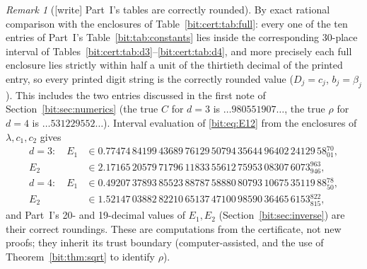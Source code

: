 \documentclass[11pt]{article}
\theoremstyle{definition}\newtheorem{definition}[theorem]{Definition}
\theoremstyle{remark}\newtheorem{remark}[theorem]{Remark}
\begin{document}
\begin{remark}[\textsf{[write]} Part~I's tables are correctly rounded]\label{bit:cert:rem:parti-tables}
By exact rational comparison with the enclosures of
Table~\ref{bit:cert:tab:full}: every one of the ten entries of Part~I's
Table~\ref{bit:tab:constants} lies inside the corresponding 30-place interval
of Tables~\ref{bit:cert:tab:d3}--\ref{bit:cert:tab:d4}, and more precisely each
full enclosure lies strictly within half a unit of the thirtieth decimal of the
printed entry, so every printed digit string is the correctly rounded value
($D_j=c_j$, $b_j=\beta_j$). This includes the two entries discussed in the
first note of Section~\ref{bit:sec:numerics} (the true $C$ for $d=3$ is
$\ldots980551907\ldots$, the true $\rho$ for $d=4$ is $\ldots531229552\ldots$).
Interval evaluation of \eqref{bit:eq:E12} from the enclosures of
$\lambda,c_1,c_2$ gives
\begin{align*}
 d=3:\quad E_1&\in0.77474\,84199\,43689\,76129\,50794\,35644\,96402\,24129\,58{}^{70}_{01},\\
 E_2&\in2.17165\,20579\,71796\,11833\,55612\,75953\,08307\,6073{}^{963}_{946},\\
 d=4:\quad E_1&\in0.49207\,37893\,85523\,88787\,58880\,80793\,10675\,35119\,88{}^{78}_{50},\\
 E_2&\in1.52147\,03882\,82210\,65137\,47100\,98590\,36465\,6153{}^{822}_{815},
\end{align*}
and Part~I's 20- and 19-decimal values of $E_1,E_2$ (Section~\ref{bit:sec:inverse})
are their correct roundings. These are computations from the certificate, not
new proofs; they inherit its trust boundary (computer-assisted, and the use of
Theorem~\ref{bit:thm:sqrt} to identify $\rho$).
\end{remark}
\end{document}
